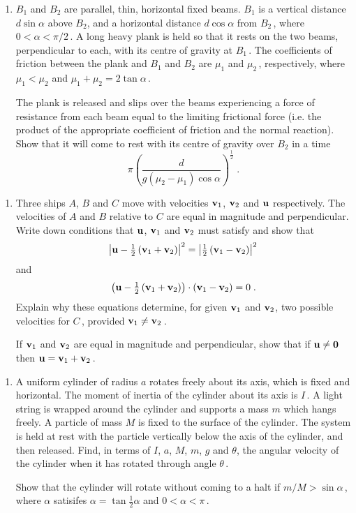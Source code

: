\documentclass[a4, 11pt]{report}
\newlength{\qspace}
\newcounter{qnumber}
\newenvironment{question}%
 {\vspace{\qspace}
  \begin{enumerate}[\bfseries 1\quad][10]%
    \setcounter{enumi}{\value{qnumber}}%
    \item%
 }
{
  \end{enumerate}
  \filbreak
  \stepcounter{qnumber}
 }
\def\l{\left(}
\def\r{\right)}
\begin{document}
	
\begin{question}
$B_1$ and $B_2$ are  parallel, thin, horizontal fixed beams.
$B_1$ is a vertical distance $d \sin \alpha $ above $B_2$, and a horizontal distance
$d\cos\alpha $ from $B_2\,$,
where $0<\alpha<\pi/2\,$. A long heavy
plank  is held so that it rests on the two beams, perpendicular to each, 
with its centre of gravity at  $B_1\,$.
The coefficients of friction between
the plank and $B_1$ and $B_2$ are $\mu_1$ and $\mu_2\,$, respectively, where $\mu_1<\mu_2$
and $\mu_1+\mu_2=2\tan\alpha\,$.

The plank is released and slips over the beams  
experiencing a force of resistance from each beam equal to the limiting
frictional force (i.e. the product of the appropriate coefficient of friction and the 
normal reaction). Show that it will come to rest with its centre of gravity over $B_2$
in a time 
\[
\pi \left(\frac{d}{g(\mu_2-\mu_1)\cos\alpha }\right)^{\!\frac12}\;.
\]
	\end{question}
	
\begin{question}	
Three ships $A$,  $B$ and $C$ move with velocities ${\bf v}_1$,
${\bf v}_2$ and $\bf u$ respectively. The velocities of $A$ and $B$ 
relative to $C$ are equal in magnitude and
perpendicular. Write down conditions that $\bf u$, ${\bf v}_1$ and ${\bf v}_2$ must satisfy
and show that
\[
\left| {\bf u} -{\textstyle\frac12} \l {\bf v}_1 + {\bf v}_2 \r \right|^2 =
\left|{\textstyle\frac12}  \l {\bf v}_1 - {\bf v}_2 \r \right|^2
\]
and
\[
\l {\bf u} -{\textstyle\frac12} \l {\bf v}_1 + {\bf v}_2 \r \r \cdot \l {\bf v}_1 -
{\bf v}_2 \r = 0 \;.
\]
Explain why these equations determine, for given ${\bf v}_1$ and ${\bf v}_2$, 
two possible velocities for  $C\,$, provided ${\bf v}_1 \ne {\bf v}_2 \,$.

If ${\bf v}_1$ and ${\bf v}_2$ are equal in magnitude and perpendicular,
show that if ${\bf u} \ne {\bf 0}$ then ${\bf u} = {\bf v}_1 + {\bf v}_2\,$.
\end{question}


\begin{question}
A uniform cylinder of radius $a$ rotates freely about its axis,
which is fixed and horizontal. The moment of inertia of the cylinder about 
its axis is $I\,$. A light string is wrapped around the
cylinder and supports a mass $m$ which hangs freely. A particle of mass
$M$ is fixed to the surface of the cylinder. The system is held at
rest with the particle  vertically below the axis of the cylinder, and
then released. Find, in terms of $I$, $a$, $M$, $m$,  $g$ and $\theta$, 
the angular velocity of
the cylinder when it has rotated through angle $\theta\,$.


Show that the cylinder will 
 rotate without coming to a halt  if
$m/M>\sin\alpha\,$, where $\alpha$ satisifes $\alpha=\tan \frac12\alpha$ and 
$0<\alpha<\pi\,$. 
\end{question}
	
\end{document}

